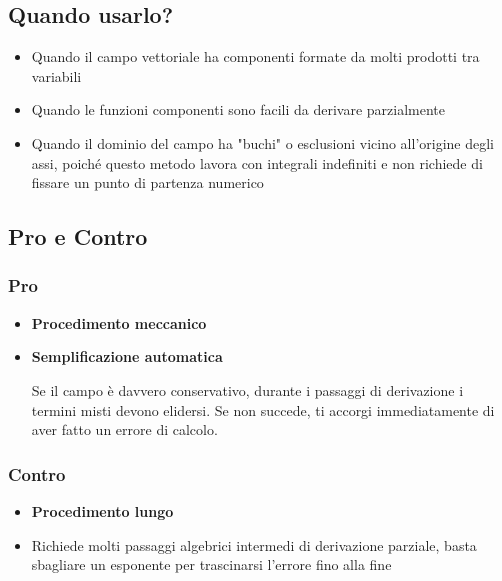 \subsection{Quando usarlo?}
\begin{itemize}
    \item Quando il campo vettoriale ha componenti formate da molti prodotti tra variabili
    \item Quando le funzioni componenti sono facili da derivare parzialmente
    \item Quando il dominio del campo ha "buchi" o esclusioni vicino all'origine degli assi, poiché questo metodo lavora con integrali indefiniti e non richiede di fissare un punto di partenza numerico
\end{itemize}
\subsection{Pro e Contro}
\subsubsection{Pro}
\begin{itemize}
    \item \textbf{Procedimento meccanico}
    \item \textbf{Semplificazione automatica} 
    
    Se il campo è davvero conservativo, durante i passaggi di derivazione i termini misti devono elidersi. Se non succede, ti accorgi immediatamente di aver fatto un errore di calcolo.
\end{itemize}
\subsubsection{Contro}
\begin{itemize}
    \item \textbf{Procedimento lungo}
    \item Richiede molti passaggi algebrici intermedi di derivazione parziale, basta sbagliare un esponente per trascinarsi l'errore fino alla fine
\end{itemize}

